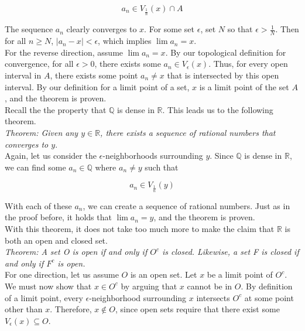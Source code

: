 \documentclass[12pt, letterpaper, twoside]{article}
\begin{document}
\begin{equation*}
    a_n \in V_{\frac{1}{n}} (x) \cap A
\end{equation*}

The sequence $a_n$ clearly converges to $x$. For some set $\epsilon$, set $N$ so that $\epsilon > \frac{1}{N}$. Then for all $n \geq N$, $| a_n - x | < \epsilon$, which implies $\lim a_n = x$. \\

For the reverse direction, assume $\lim a_n = x$. By our topological definition for convergence, for all $\epsilon > 0$, there exists some $a_n \in V_\epsilon (x)$. Thus, for every open interval in $A$, there exists some point $a_n \neq x$ that is intersected by this open interval. By our definition for a limit point of a set, $x$ is a limit point of the set $A$, and the theorem is proven. \\

Recall the the property that $\mathbb{Q}$ is dense in $\mathbb{R}$. This leads us to the following theorem. \\

\textit{Theorem: Given any $y \in \mathbb{R}$, there exists a sequence of rational numbers that converges to $y$}. \\

Again, let us consider the $\epsilon$-neighborhoods surrounding $y$. Since $\mathbb{Q}$ is dense in $\mathbb{R}$, we can find some $a_n \in \mathbb{Q}$ where $a_n \neq y$ such that

\begin{equation*}
    a_n \in V_{\frac{1}{n}} (y)
\end{equation*}

With each of these $a_n$, we can create a sequence of rational numbers. Just as in the proof before, it holds that $\lim a_n = y$, and the theorem is proven. \\

With this theorem, it does not take too much more to make the claim that $\mathbb{R}$ is both an open and closed set. \\

\textit{Theorem: A set O is open if and only if $O^c$ is closed. Likewise, a set F is closed if and only if $F^c$ is open. } \\

For one direction, let us assume $O$ is an open set. Let $x$ be a limit point of $O^c$. We must now show that $x \in O^c$ by arguing that $x$ cannot be in $O$. By definition of a limit point, every $\epsilon$-neighborhood surrounding $x$ intersects $O^c$ at some point other than $x$. Therefore, $x \not \in O$, since open sets require that there exist some $V_\epsilon (x) \subseteq O$. \\
\end{document}

